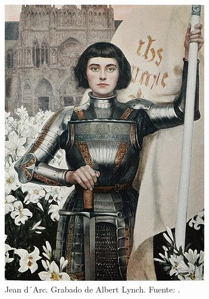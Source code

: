 \begin{landscape}
	\begin{figure}
		\centering
		\begin{subfigure}[t]{.5\textwidth}
			\includegraphics[width=\textwidth, frame]{cuerpo/cap-objetos/imagenes/juana-arco}
			\caption[Jean d´Arc]{Jean d´Arc. Grabado de Albert Lynch. Fuente: \cite{wikipedia-juana}.}
			\label{fig:juana-arco}
		\end{subfigure}
		\begin{subfigure}[t]{0.5\textwidth}

\end{subfigure}
\end{figure}
\end{landscape}
